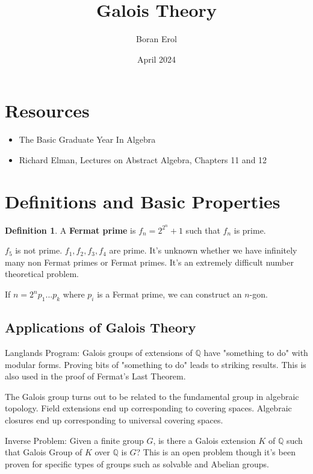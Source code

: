 \documentclass{article}
\title{Galois Theory}
\date{April 2024}
\author{Boran Erol}
\theoremstyle{definition}
\newtheorem{definition}{Definition}
\newcommand{\Q}{\mathbb{Q}}
\begin{document}
\maketitle

\section{Resources}

\begin{itemize}
    \item The Basic Graduate Year In Algebra
    \item Richard Elman, Lectures on Abstract Algebra, Chapters 11 and 12
\end{itemize}

\section{Definitions and Basic Properties}

\begin{definition}
    A \textbf{Fermat prime} is $f_{n} = 2^{2^{n}} + 1$ such that $f_{n}$ is prime.
\end{definition}

$f_{5}$ is not prime. $f_{1},f_{2},f_{3},f_{4}$ are prime. It's unknown whether we have
infinitely many non Fermat primes or Fermat primes. It's an extremely difficult number
theoretical problem.

If $n = 2^{n}p_{1}...p_{k}$ where $p_{i}$ is a Fermat prime, we can construct an $n$-gon.

\subsection{Applications of Galois Theory}

Langlands Program: Galois groups of extensions of $\Q$ have "something to do" with modular forms.
Proving bits of "something to do" leads to striking results. This is also used in the proof
of Fermat's Last Theorem.

The Galois group turns out to be related to the fundamental group in algebraic topology.
Field extensions end up corresponding to covering spaces. Algebraic closures end
up corresponding to universal covering spaces.

Inverse Problem: Given a finite group $G$, is there a Galois extension $K$ of $\Q$ such that Galois Group
of $K$ over $\Q$ is $G$? This is an open problem though it's been proven for specific types of groups such
as solvable and Abelian groups.
\end{document}
